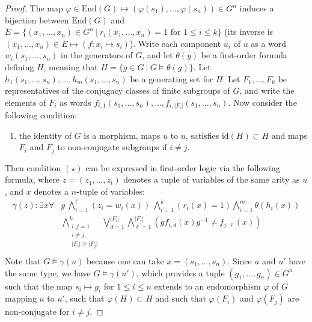 \documentclass[a4paper, 11pt]{amsart}
\theoremstyle{definition}
\theoremstyle{remark}
\renewcommand{\leq}{\leqslant}
\renewcommand{\geq}{\geqslant}
\newcommand{\gianluca}[1]{{\textcolor{blue}{Gianluca: #1}} }
\begin{document}
\begin{proof}
The map $\varphi\in \mathrm{End}(G)\mapsto (\varphi(s_1),\ldots,\varphi(s_n))\in G^n$ induces a bijection between $\mathrm{End}(G)$ and $E=\lbrace (x_1,\ldots,x_n)\in G^n \ \vert \ r_i(x_1,\ldots,x_n)=1 \text{ for } 1\leq i\leq k\rbrace$ (its inverse is $(x_1,\ldots,x_n)\in E\mapsto (f : x_i\mapsto s_i)$). Write each component $u_i$ of $u$ as a word $w_i(s_1,\ldots,s_n)$ in the generators of $G$, and let $\theta(y)$ be a first-order formula defining $H$, meaning that $H=\lbrace g\in G \ \vert \ G\models \theta(g)\rbrace$. Let $h_1(s_1,\ldots,s_n),\ldots,h_m(s_1,\ldots,s_n)$ be a generating set for $H$. Let $F_1,\ldots,F_k$ be representatives of the conjugacy classes of finite subgroups of $G$, and write the elements of $F_i$ as words $f_{i,1}(s_1,\ldots,s_n),\ldots,f_{i,\vert F_i\vert}(s_1,\ldots,s_n)$. Now consider the following condition:
\begin{enumerate}[$(\star)$]
\item the identity of $G$ is a morphism, maps $u$ to $u$, satisfies $\mathrm{id}(H)\subset H$ and maps $F_i$ and $F_j$ to non-conjugate subgroups if $i\neq j$.
\end{enumerate}
Then condition $(\star)$ can be expressed in first-order logic via the following formula, where $z=(z_1,\ldots,z_{t})$ denotes a tuple of variables of the same arity as $u$, and $x$ denotes a $n$-tuple of variables:
\begin{align*}
\gamma(z): \exists x \forall & g \ \bigwedge_{i=1}^{t}(z_i=w_i(x)) \ \bigwedge_{i=1}^k(r_i(x)=1) \bigwedge_{i=1}^m\theta(h_i(x))  \\
           &\bigwedge\limits_{\substack{i,j=1 \\ i \neq j \\ \vert F_i\vert\geq \vert F_j\vert}}^{k}\bigvee_{d=1}^{\vert F_i\vert}\bigwedge_{\ell=1}^{\vert F_j\vert}(gf_{i,d}(x)g^{-1}\neq f_{j,\ell}(x)) \\
\end{align*}
Note that $G\models \gamma(u)$ because one can take $x=(s_1,\ldots,s_n)$. Since $u$ and $u'$ have the same type, we have $G\models \gamma(u')$, which provides a tuple $(g_1,\ldots,g_n)\in G^n$ such that the map $s_i\mapsto g_i$ for $1\leq i\leq n$ extends to an endomorphism $\varphi$ of $G$ mapping $u$ to $u'$, such that $\varphi(H)\subset H$ and such that $\varphi(F_i)$ and $\varphi(F_j)$ are non-conjugate for $i\neq j$. 


\end{proof}
\end{document}

